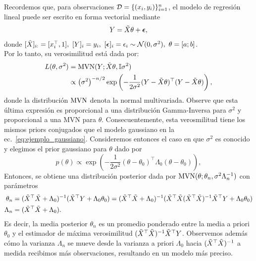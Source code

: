 \begin{mdframed}[style=ejemplo, frametitle={\center Ejemplo: distribución posterior del modelo lineal y gaussiano}]
Recordemos que, para observaciones ${\mathcal D}=\{(x_i,y_i)\}_{i=1}^n$, el modelo de regresión lineal puede ser escrito en forma vectorial mediante
\begin{equation}
 	Y = \tilde{X}\theta + {\bm \epsilon},
 \end{equation}
 donde $[\tX]_{i:} = [x_i^\top,1],\ [Y]_i = y_i,\ [\bepsilon]_i = \epsilon_i\sim\cN(0,\sigma^2),\ \theta = [a;b]$.\\
 
Por lo tanto, su verosimilitud está dada por:
\begin{align}
	L(\theta,\sigma^2) &= \operatorname{\text{MVN}}(Y; \tilde{X}\theta, {\mathbb I}\sigma^2)\\
					&\propto \left(\sigma^2\right)^{-n/2}   \exp\left(-\frac{1}{2\sigma^2} (Y - \tilde{X}\theta)^\top(Y - \tilde{X}\theta)\right),\nonumber
\end{align}
donde la distribución $\operatorname{\text{MVN}}$ denota la normal multivariada. Observe que esta última  expresión es proporcional a una distribución Gamma-Inversa para $\sigma^2$ y proporcional a una MVN para $\theta$. Consecuentemente, esta verosmilitud tiene los mismos priors conjugados que el modelo gaussiano en la ec.~\eqref{eq:ejemplo_gaussiano}. Consideremos entonces el caso en que $\sigma^2$ es conocido y elegimos el prior gaussiano para $\theta$ dado por
\begin{equation}
	p(\theta) \propto \exp\left(-\frac{1}{2\sigma^2}(\theta-\theta_0)^\top\Lambda_0(\theta-\theta_0)\right), 
\end{equation}
Entonces, se obtiene una distribución posterior dada por $\operatorname{\text{MVN}}(\theta; \theta_n,\sigma^2\Lambda_n^{-1})$ con parámetros 
\begin{align}
	\theta_n &= (\tilde{X}^\top \tilde{X} + \Lambda_0)^{-1} (\tilde{X}^\top  Y + \Lambda_0\theta_0) = (\tilde{X}^\top \tilde{X} + \Lambda_0)^{-1} (\tilde{X}^\top \tilde{X} (\tilde{X}^\top \tilde{X})^{-1}\tilde{X}^\top  Y + \Lambda_0\theta_0)\label{eq:mean_post_lin_g}\\
	\Lambda_n &= (\tilde{X}^\top \tilde{X} + \Lambda_0). \label{eq:var_post_lin_g}
\end{align}
Es decir, la media posterior $\theta_n$ es un promedio ponderado entre la media a priori $\theta_0$ y el estimador de máxima verosimilitud $(\tilde{X}^\top \tilde{X})^{-1}\tilde{X}^\top  Y$. Observemos además cómo la varianza $\Lambda_n$ se mueve desde la varianza a priori $\Lambda_0$ hacia $(\tilde{X}^\top \tilde{X})^{-1}$ a medida recibimos más observaciones, resultando en un modelo más preciso.


\end{mdframed}
